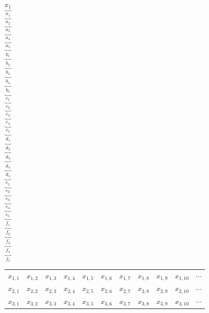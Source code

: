 \documentclass{article}
\begin{document}
$
\underbrace{\underbrace{\underbrace{\underbrace{\underbrace{
\underbrace{\underbrace{\underbrace{\underbrace{\underbrace{
\underbrace{\underbrace{\underbrace{\underbrace{\underbrace{
\underbrace{\underbrace{\underbrace{\underbrace{\underbrace{
\underbrace{\underbrace{\underbrace{\underbrace{\underbrace{
\underbrace{\underbrace{\underbrace{\underbrace{\underbrace{
x_1
}_{a_1}}_{a_2}}_{a_3}}_{a_4}}_{a_5}
}_{b_1}}_{b_2}}_{b_3}}_{b_4}}_{b_5}
}_{c_1}}_{c_2}}_{c_3}}_{c_4}}_{c_5}
}_{d_1}}_{d_2}}_{d_3}}_{d_4}}_{d_5}
}_{e_1}}_{e_2}}_{e_3}}_{e_4}}_{e_5}
}_{f_1}}_{f_2}}_{f_3}}_{f_4}}_{f_5}
$

\begin{tabular}{ccccccccccc}
$x_{1,1}$ & $x_{1,2}$ & $x_{1,3}$ & $x_{1,4}$ & $x_{1,5}$ & $x_{1,6}$ & $x_{1,7}$ & $x_{1,8}$ & $x_{1,9}$ & $x_{1,10}$ & $\cdots$ \\
$x_{2,1}$ & $x_{2,2}$ & $x_{2,3}$ & $x_{2,4}$ & $x_{2,5}$ & $x_{2,6}$ & $x_{2,7}$ & $x_{2,8}$ & $x_{2,9}$ & $x_{2,10}$ & $\cdots$ \\
$x_{3,1}$ & $x_{3,2}$ & $x_{3,3}$ & $x_{3,4}$ & $x_{3,5}$ & $x_{3,6}$ & $x_{3,7}$ & $x_{3,8}$ & $x_{3,9}$ & $x_{3,10}$ & $\cdots$ \\
\end{tabular}
\end{document}
